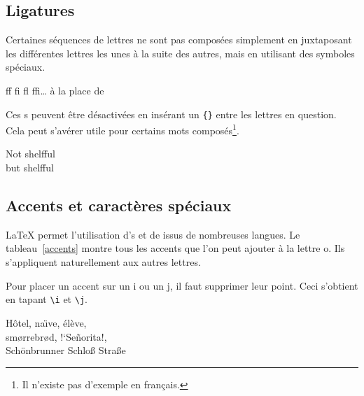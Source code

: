 \subsection{Ligatures}

Certaines séquences de lettres ne sont pas composées simplement en
juxtaposant les différentes lettres les unes à la suite des autres,
mais en utilisant des symboles spéciaux.
\begin{code}
{\large ff fi fl ffi\dots}\quad
\`a la place de
\end{code}
Ces s peuvent être désactivées en insérant un
\verb|{}| entre les lettres en question. Cela peut s'avérer
utile pour certains mots composés\footnote{Il n'existe pas d'exemple en
français. \NdT}.
\begin{example}
\Large Not shelfful\\
but shelf{}ful
\end{example}

\subsection{Accents et caractères spéciaux}

\LaTeX{} permet l'utilisation d's et de  issus de nombreuses langues. Le tableau~\ref{accents} montre
tous les accents que l'on peut ajouter à la lettre o. Ils s'appliquent
naturellement aux autres lettres.

Pour placer un accent sur un i ou un j, il faut supprimer leur
point. Ceci s'obtient en tapant \verb|\i| et \verb|\j|.

\begin{example}
H\^otel, na\"\i ve, \'el\`eve,\\
sm\o rrebr\o d, !`Se\~norita!,\\
Sch\"onbrunner Schlo\ss{}
Stra\ss e
\end{example}

